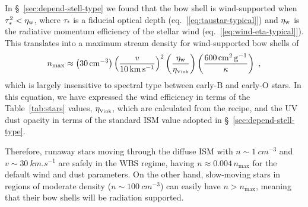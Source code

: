 In \S~\ref{sec:depend-stell-type} we found that the bow shell is
wind-supported when \(\tau_*^2 < \eta_{\text{w}}\), where \(\tau_*\) is a fiducial
optical depth (eq.~[\ref{eq:taustar-typical}]) and \(\eta_{\text{w}}\) is the
radiative momentum efficiency of the stellar wind
(eq.~[\ref{eq:wind-eta-typical}]).  This translates into a maximum
stream density for wind-supported bow shells of
\newcommand\crit{\ensuremath{_{\text{max}}}}
\newcommand\vink{\ensuremath{_{\text{\tiny Vink}}}}
\begin{equation}
  \label{eq:ncrit}
  n\crit \approx \left(\SI{30}{cm^{-3}}\right)
  \left(  \frac{v} {\SI{10}{km.s^{-1}}}\right)^2
  \left( \frac{\eta\wind}{\eta\vink} \right)
  \left( \frac{\SI{600}{cm^2.g^{-1}}}{\kappa} \right)
  \ ,
\end{equation}
which is largely insensitive to spectral type between early-B and
early-O stars.  In this equation, we have expressed the wind
efficiency in terms of the Table~\ref{tab:stars} values,
\(\eta\vink\), which are calculated from the \citet{Vink:2000a} recipe,
and the UV dust opacity in terms of the standard ISM value adopted in
\S~\ref{sec:depend-stell-type}.

Therefore, runaway stars moving through the diffuse ISM with
\(n \sim \SI{1}{cm^{-3}}\) and \(v \sim \SI{30}{km.s^{-1}}\) are safely in
the WBS regime, having \(n \approx \num{0.004}\, n\crit\) for the default
wind and dust parameters.  On the other hand, slow-moving stars in
\hii{} regions of moderate density (\(n \sim \SI{100}{cm^{-3}}\)) can
easily have \(n > n\crit\), meaning that their bow shells will be radiation
supported.

